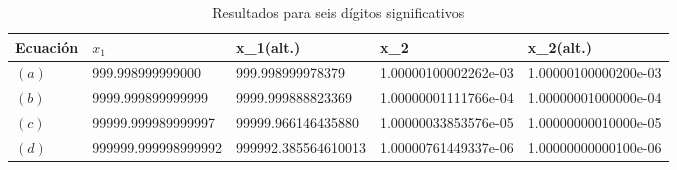 \documentclass[a4paper, 10pt, spanish]{article}
\begin{document}
\begin{table}
\begin{center}
  \begin{tabular}{ | l | l | l| l | p{3.5cm} |}
    \hline
    Ecuación   & $x_{1}                 $ &  x_{1(alt.)}          & x_{2}                   & x_{2(alt.)}         \\ \hline
    $(a)     $ & 999.998999999000         &    999.998999978379   & 1.00000100002262e-03    & 1.00000100000200e-03\\ \hline
    $(b)     $ & 9999.999899999999        &  9999.999888823369    & 1.00000001111766e-04    & 1.00000001000000e-04\\ \hline
    $(c)     $ & 99999.999989999997       &  99999.966146435880   & 1.00000033853576e-05    & 1.00000000010000e-05\\ \hline
    $(d)     $ & 999999.999998999992      &  999992.385564610013  & 1.00000761449337e-06    & 1.00000000000100e-06\\ \hline
    
    \end{tabular}
\caption{Resultados para seis dígitos significativos}
\end{center}
\end{table}  
\end{document}
